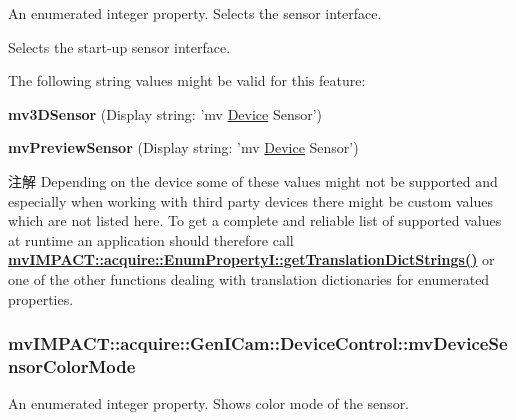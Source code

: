 An enumerated integer property. Selects the sensor interface. 

Selects the start-\/up sensor interface.

The following string values might be valid for this feature\+:
\begin{DoxyItemize}
\item {\bfseries mv3\+D\+Sensor} (Display string\+: 'mv \hyperlink{classmv_i_m_p_a_c_t_1_1acquire_1_1_device}{Device} Sensor')
\item {\bfseries mv\+Preview\+Sensor} (Display string\+: 'mv \hyperlink{classmv_i_m_p_a_c_t_1_1acquire_1_1_device}{Device} Sensor')
\end{DoxyItemize}

\begin{DoxyNote}{注解}
Depending on the device some of these values might not be supported and especially when working with third party devices there might be custom values which are not listed here. To get a complete and reliable list of supported values at runtime an application should therefore call {\bfseries \hyperlink{classmv_i_m_p_a_c_t_1_1acquire_1_1_enum_property_i_a0ba6ccbf5ee69784d5d0b537924d26b6}{mv\+I\+M\+P\+A\+C\+T\+::acquire\+::\+Enum\+Property\+I\+::get\+Translation\+Dict\+Strings()}} or one of the other functions dealing with translation dictionaries for enumerated properties. 
\end{DoxyNote}
\hypertarget{classmv_i_m_p_a_c_t_1_1acquire_1_1_gen_i_cam_1_1_device_control_a51865e07a49ab782998b913c8fb789b4}{
\subsubsection[{mv\+Device\+Sensor\+Color\+Mode}]{ mv\+I\+M\+P\+A\+C\+T\+::acquire\+::\+Gen\+I\+Cam\+::\+Device\+Control\+::mv\+Device\+Sensor\+Color\+Mode}}\label{classmv_i_m_p_a_c_t_1_1acquire_1_1_gen_i_cam_1_1_device_control_a51865e07a49ab782998b913c8fb789b4}


An enumerated integer property. Shows color mode of the sensor. 


